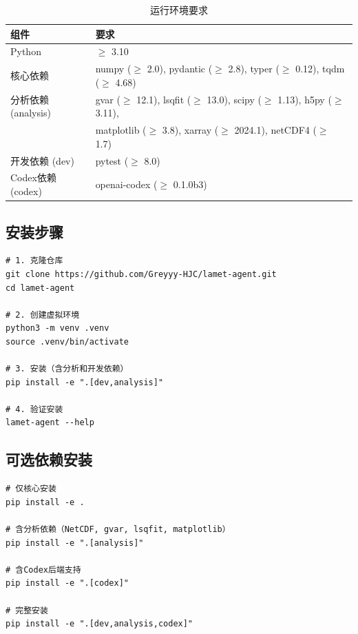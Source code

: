 \documentclass[12pt,a4paper]{ctexart}
\begin{document}
\begin{table}[H]
\centering
\caption{运行环境要求}
\label{tab:requirements}
\begin{tabular}{@{}ll@{}}
\toprule
\textbf{组件} & \textbf{要求} \\
\midrule
Python & $\ge$ 3.10 \\
核心依赖 & numpy ($\ge$ 2.0), pydantic ($\ge$ 2.8), typer ($\ge$ 0.12), tqdm ($\ge$ 4.68) \\
分析依赖 (analysis) & gvar ($\ge$ 12.1), lsqfit ($\ge$ 13.0), scipy ($\ge$ 1.13), h5py ($\ge$ 3.11), \\
 & matplotlib ($\ge$ 3.8), xarray ($\ge$ 2024.1), netCDF4 ($\ge$ 1.7) \\
开发依赖 (dev) & pytest ($\ge$ 8.0) \\
Codex依赖 (codex) & openai-codex ($\ge$ 0.1.0b3) \\
\bottomrule
\end{tabular}
\end{table}

\subsection{安装步骤}

\begin{lstlisting}[caption={lamet-agent 安装流程}]
# 1. 克隆仓库
git clone https://github.com/Greyyy-HJC/lamet-agent.git
cd lamet-agent

# 2. 创建虚拟环境
python3 -m venv .venv
source .venv/bin/activate

# 3. 安装（含分析和开发依赖）
pip install -e ".[dev,analysis]"

# 4. 验证安装
lamet-agent --help
\end{lstlisting}

\subsection{可选依赖安装}

\begin{lstlisting}[caption={按需安装可选依赖}]
# 仅核心安装
pip install -e .

# 含分析依赖（NetCDF, gvar, lsqfit, matplotlib）
pip install -e ".[analysis]"

# 含Codex后端支持
pip install -e ".[codex]"

# 完整安装
pip install -e ".[dev,analysis,codex]"
\end{lstlisting}

\end{document}
